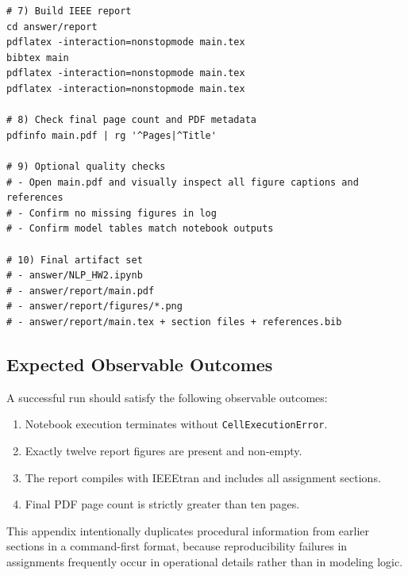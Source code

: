 \begin{lstlisting}[basicstyle=\ttfamily\scriptsize,frame=single]
# 7) Build IEEE report
cd answer/report
pdflatex -interaction=nonstopmode main.tex
bibtex main
pdflatex -interaction=nonstopmode main.tex
pdflatex -interaction=nonstopmode main.tex

# 8) Check final page count and PDF metadata
pdfinfo main.pdf | rg '^Pages|^Title'

# 9) Optional quality checks
# - Open main.pdf and visually inspect all figure captions and references
# - Confirm no missing figures in log
# - Confirm model tables match notebook outputs

# 10) Final artifact set
# - answer/NLP_HW2.ipynb
# - answer/report/main.pdf
# - answer/report/figures/*.png
# - answer/report/main.tex + section files + references.bib
\end{lstlisting}

\subsection{Expected Observable Outcomes}

A successful run should satisfy the following observable outcomes:
\begin{enumerate}
    \item Notebook execution terminates without \texttt{CellExecutionError}.
    \item Exactly twelve report figures are present and non-empty.
    \item The report compiles with IEEEtran and includes all assignment sections.
    \item Final PDF page count is strictly greater than ten pages.
\end{enumerate}

This appendix intentionally duplicates procedural information from earlier sections in a command-first format, because reproducibility failures in assignments frequently occur in operational details rather than in modeling logic.
